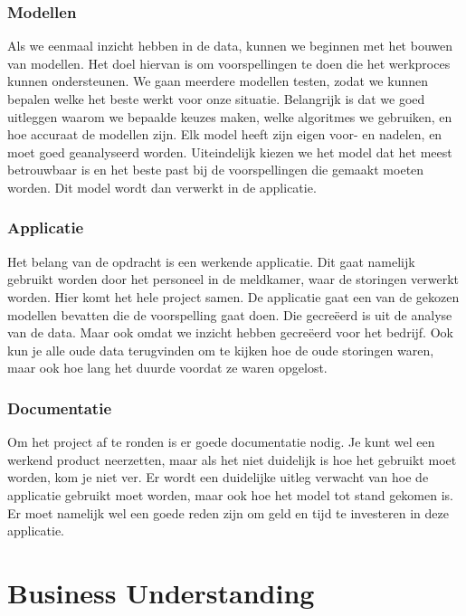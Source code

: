 \documentclass{article}
\begin{document}
\subsubsection{Modellen}
Als we eenmaal inzicht hebben in de data, kunnen we beginnen met het bouwen van modellen. Het doel hiervan is om voorspellingen te doen die het werkproces kunnen ondersteunen. We gaan meerdere modellen testen, zodat we kunnen bepalen welke het beste werkt voor onze situatie. Belangrijk is dat we goed uitleggen waarom we bepaalde keuzes maken, welke algoritmes we gebruiken, en hoe accuraat de modellen zijn. Elk model heeft zijn eigen voor- en nadelen, en moet goed geanalyseerd worden. Uiteindelijk kiezen we het model dat het meest betrouwbaar is en het beste past bij de voorspellingen die gemaakt moeten worden. Dit model wordt dan verwerkt in de applicatie.
 
\subsubsection{Applicatie}
Het belang van de opdracht is een werkende applicatie. Dit gaat namelijk gebruikt worden door het personeel in de meldkamer, waar de storingen verwerkt worden. Hier komt het hele project samen. De applicatie gaat een van de gekozen modellen bevatten die de voorspelling gaat doen. Die gecreëerd is uit de analyse van de data. Maar ook omdat we inzicht hebben gecreëerd voor het bedrijf. Ook kun je alle oude data terugvinden om te kijken hoe de oude storingen waren, maar ook hoe lang het duurde voordat ze waren opgelost.

\subsubsection{Documentatie}
Om het project af te ronden is er goede documentatie nodig. Je kunt wel een werkend product neerzetten, maar als het niet duidelijk is hoe het gebruikt moet worden, kom je niet ver. Er wordt een duidelijke uitleg verwacht van hoe de applicatie gebruikt moet worden, maar ook hoe het model tot stand gekomen is. Er moet namelijk wel een goede reden zijn om geld en tijd te investeren in deze applicatie.
 
\newpage
\section{Business Understanding}
\end{document}
